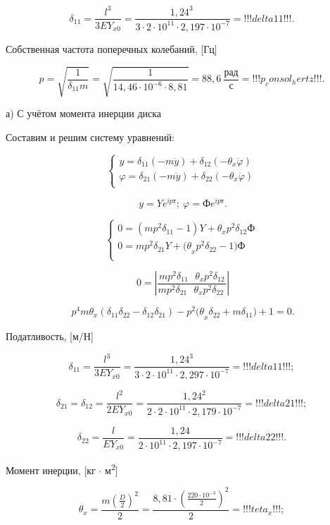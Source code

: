\[\delta_{11} = \frac{l^{3}}{3EY_{x0}} = \frac{{1,24}^{3}\ }{3\cdot2\cdot10^{11}\cdot2,197\cdot10^{- 7}} = !!!delta11!!!.\ \]

Собственная частота поперечных колебаний, [Гц]

\[p = \sqrt{\frac{1}{\delta_{11}m}} = \sqrt{\frac{1}{14,46\cdot10^{- 6}\cdot8,81}} = 88,6\ \frac{рад}{с} = !!!p_consol_hertz!!!.\ \]

а) С учётом момента инерции диска

Составим и решим систему уравнений:

\[\left\{ \begin{matrix}
y = \delta_{11}\left( - m\ddot{y} \right) + \delta_{12}( - \theta_{x}\ddot{\varphi}) \\
\varphi = \delta_{21}\left( - m\ddot{y} \right) + \delta_{22}( - \theta_{x}\ddot{\varphi}) \\
\end{matrix} \right.\ \]

\[y = Ye^{\textit{ipт}};\ \varphi = Фe^{\textit{ipт}}.\]

\[\left\{ 
\begin{matrix}
0 = \left( mp^{2}\delta_{11} - 1 \right)Y + \theta_{x}p^{2}\delta_{12}Ф \\
0 = mp^{2}\delta_{21}Y + {(\theta}_{x}p^{2}\delta_{22} - 1)Ф \\
\end{matrix} 
\right.\ \]

\[0 = \left| \frac{mp^{2}\delta_{11}\textit{\ \ \ \ }\theta_{x}p^{2}\delta_{12}}{mp^{2}\delta_{21}\textit{\ \ \ }\theta_{x}p^{2}\delta_{22}\ } \right|\]

\[p^{4}m\theta_{x}\left( \delta_{11}\delta_{22} - \delta_{12}\delta_{21} \right) - p^{2}{(\theta}_{x}\delta_{22} + m\delta_{11}) + 1 = 0.\]

Податливость, [м/Н]

\[\delta_{11} = \frac{l^{3}}{3EY_{x0}} = \frac{{1,24}^{3}}{3\cdot2\cdot10^{11}\cdot2,297\cdot10^{- 7}} = !!!delta11!!!;\ \]


\[\delta_{21} = \delta_{12} = \frac{l^{2}}{2EY_{x0}} = \frac{{1,24}^{2}}{2\cdot2\cdot10^{11}\cdot2,179\cdot10^{- 7}} = !!!delta21!!!;\ \]


\[\delta_{22} = \frac{l}{EY_{x0}} = \frac{1,24}{2\cdot10^{11}\cdot2,197\cdot10^{- 7}} = !!!delta22!!!.\ \]

Момент инерции, [кг $\cdot$ м\textsuperscript{2}]

\[\theta_{x} = \frac{m\left( \frac{D}{2} \right)^{2}}{2} = \frac{8,81\cdot\left( \frac{220\cdot10^{- 3}}{2} \right)^{2}}{2} = !!!teta_x!!!;\ \]

